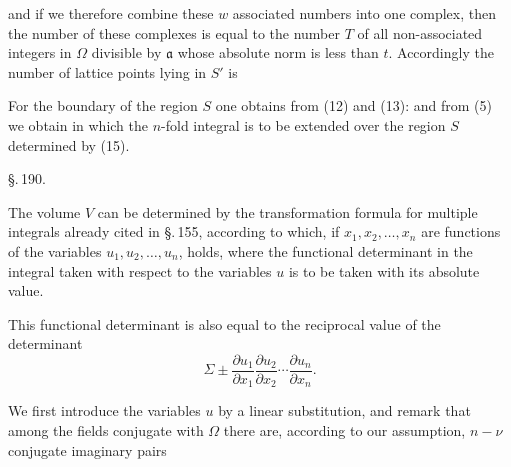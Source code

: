 and if we therefore combine these $w$ associated numbers into one complex, then the number of these complexes is equal to the number $T$ of all non-associated integers in $\Omega$ divisible by $\mathfrak{a}$ whose absolute norm is less than $t$. Accordingly the number of lattice points lying in $S'$ is

For the boundary of the region $S$ one obtains from (12) and (13):
and from (5) we obtain
in which the $n$-fold integral is to be extended over the region $S$ determined by (15).

\begin{center}
\S.\,190.

\end{center}

The volume $V$ can be determined by the transformation formula for multiple integrals already cited in \S.\,155, according to which, if $x_1, x_2, \ldots, x_n$ are functions of the variables $u_1, u_2, \ldots, u_n$,
holds, where the functional determinant in the integral taken with respect to the variables $u$ is to be taken with its absolute value.

This functional determinant is also equal to the reciprocal value of the determinant
\[ \Sigma \pm \frac{\partial u_1}{\partial x_1} \frac{\partial u_2}{\partial x_2} \cdots \frac{\partial u_n}{\partial x_n}. \]

We first introduce the variables $u$ by a linear substitution, and remark that among the fields conjugate with $\Omega$ there are, according to our assumption, $n - \nu$ conjugate imaginary pairs
